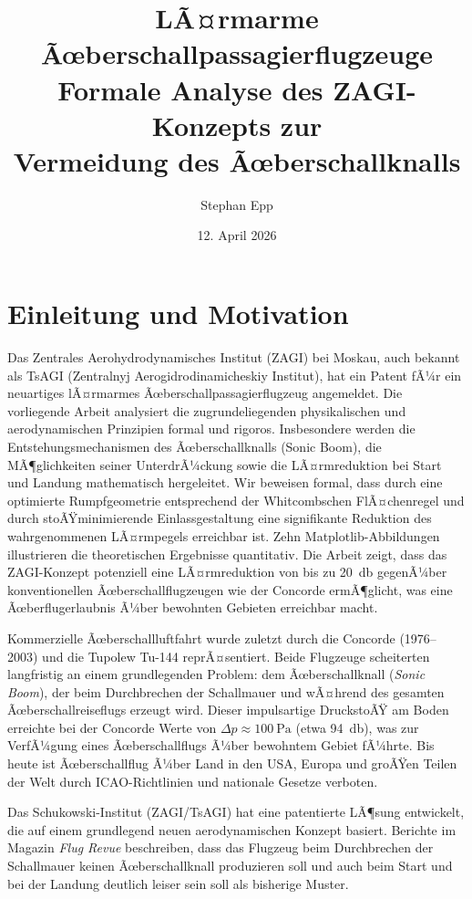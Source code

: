 ﻿\documentclass[12pt,a4paper]{article}
\title{\textbf{LÃ¤rmarme Ãœberschallpassagierflugzeuge}\\[-0.2em]
	Formale Analyse des ZAGI-Konzepts zur \\ Vermeidung des Ãœberschallknalls}
\author{Stephan Epp}
\date{12. April 2026}
\theoremstyle{definition}
\theoremstyle{remark}
\begin{document}

\maketitle
\tableofcontents
\newpage

\section{Einleitung und Motivation}
\label{sec:einleitung}
    Das Zentrales Aerohydrodynamisches Institut (ZAGI) bei Moskau, auch bekannt als
TsAGI (Zentralnyj Aerogidrodinamicheskiy Institut), hat ein Patent fÃ¼r ein neuartiges
lÃ¤rmarmes Ãœberschallpassagierflugzeug angemeldet. Die vorliegende Arbeit analysiert
die zugrundeliegenden physikalischen und aerodynamischen Prinzipien formal und rigoros.
Insbesondere werden die Entstehungsmechanismen des Ãœberschallknalls (Sonic Boom), die
MÃ¶glichkeiten seiner UnterdrÃ¼ckung sowie die LÃ¤rmreduktion bei Start und Landung mathematisch
hergeleitet. Wir beweisen formal, dass durch eine optimierte Rumpfgeometrie entsprechend
der Whitcombschen FlÃ¤chenregel und durch stoÃŸminimierende Einlassgestaltung eine signifikante
Reduktion des wahrgenommenen LÃ¤rmpegels erreichbar ist. Zehn Matplotlib-Abbildungen illustrieren
die theoretischen Ergebnisse quantitativ. Die Arbeit zeigt, dass das ZAGI-Konzept potenziell
eine LÃ¤rmreduktion von bis zu \SI{20}{\decibel} gegenÃ¼ber konventionellen Ãœberschallflugzeugen
wie der Concorde ermÃ¶glicht, was eine Ãœberflugerlaubnis Ã¼ber bewohnten Gebieten erreichbar
macht.

Kommerzielle Ãœberschallluftfahrt wurde zuletzt durch die Concorde (1976--2003) und die
Tupolew Tu-144 reprÃ¤sentiert. Beide Flugzeuge scheiterten langfristig an einem grundlegenden
Problem: dem Ãœberschallknall (\emph{Sonic Boom}), der beim Durchbrechen der Schallmauer und
wÃ¤hrend des gesamten Ãœberschallreiseflugs erzeugt wird. Dieser impulsartige DruckstoÃŸ am
Boden erreichte bei der Concorde Werte von $\Delta p \approx \SI{100}{\pascal}$ (etwa
\SI{94}{\decibel}), was zur VerfÃ¼gung eines Ãœberschallflugs Ã¼ber bewohntem Gebiet fÃ¼hrte.
Bis heute ist Ãœberschallflug Ã¼ber Land in den USA, Europa und groÃŸen Teilen der Welt
durch ICAO-Richtlinien und nationale Gesetze verboten.

Das Schukowski-Institut (ZAGI/TsAGI) hat eine patentierte LÃ¶sung entwickelt, die auf einem
grundlegend neuen aerodynamischen Konzept basiert. Berichte im Magazin \emph{Flug Revue}
beschreiben, dass das Flugzeug beim Durchbrechen der Schallmauer keinen Ãœberschallknall
produzieren soll und auch beim Start und bei der Landung deutlich leiser sein soll als
bisherige Muster.
\end{document}
